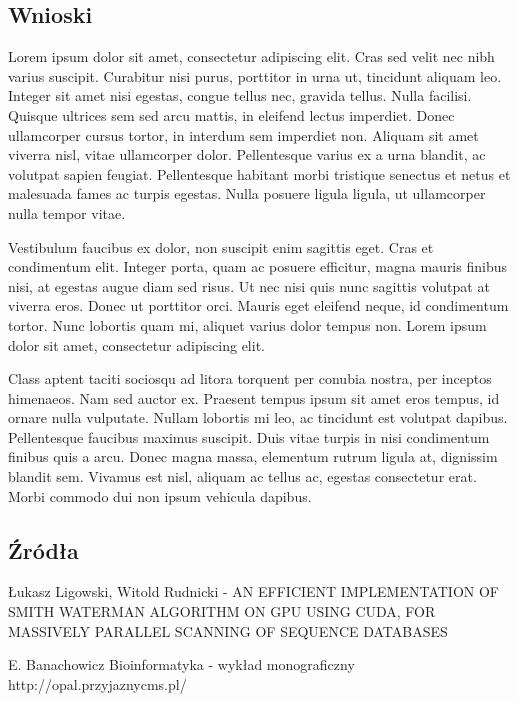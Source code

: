 \documentclass[a4paper,12pt]{article}
\begin{document}
\subsection*{Wnioski}
Lorem ipsum dolor sit amet, consectetur adipiscing elit. Cras sed velit nec nibh varius suscipit. Curabitur nisi purus, porttitor in urna ut, tincidunt aliquam leo. Integer sit amet nisi egestas, congue tellus nec, gravida tellus. Nulla facilisi. Quisque ultrices sem sed arcu mattis, in eleifend lectus imperdiet. Donec ullamcorper cursus tortor, in interdum sem imperdiet non. Aliquam sit amet viverra nisl, vitae ullamcorper dolor. Pellentesque varius ex a urna blandit, ac volutpat sapien feugiat. Pellentesque habitant morbi tristique senectus et netus et malesuada fames ac turpis egestas. Nulla posuere ligula ligula, ut ullamcorper nulla tempor vitae.

Vestibulum faucibus ex dolor, non suscipit enim sagittis eget. Cras et condimentum elit. Integer porta, quam ac posuere efficitur, magna mauris finibus nisi, at egestas augue diam sed risus. Ut nec nisi quis nunc sagittis volutpat at viverra eros. Donec ut porttitor orci. Mauris eget eleifend neque, id condimentum tortor. Nunc lobortis quam mi, aliquet varius dolor tempus non. Lorem ipsum dolor sit amet, consectetur adipiscing elit.

Class aptent taciti sociosqu ad litora torquent per conubia nostra, per inceptos himenaeos. Nam sed auctor ex. Praesent tempus ipsum sit amet eros tempus, id ornare nulla vulputate. Nullam lobortis mi leo, ac tincidunt est volutpat dapibus. Pellentesque faucibus maximus suscipit. Duis vitae turpis in nisi condimentum finibus quis a arcu. Donec magna massa, elementum rutrum ligula at, dignissim blandit sem. Vivamus est nisl, aliquam ac tellus ac, egestas consectetur erat. Morbi commodo dui non ipsum vehicula dapibus.

\subsection*{Źródła}
Łukasz Ligowski, Witold Rudnicki - AN EFFICIENT IMPLEMENTATION OF SMITH WATERMAN ALGORITHM ON GPU USING CUDA, FOR MASSIVELY PARALLEL SCANNING OF SEQUENCE DATABASES

E. Banachowicz Bioinformatyka - wykład monograficzny 
http://opal.przyjaznycms.pl/
\end{document}
